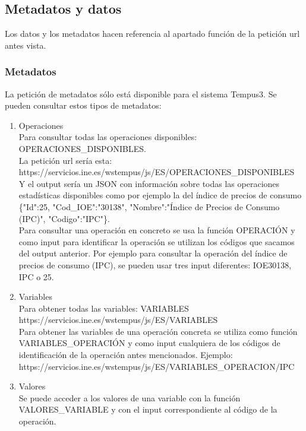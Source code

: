 \subsection{Metadatos y datos}
Los datos y los metadatos hacen referencia al apartado {función} de la petición url antes vista.
\subsubsection{Metadatos}
La petición de metadatos sólo está disponible para el sistema Tempus3. Se pueden consultar estos tipos de metadatos:
\begin{enumerate}
    \item Operaciones\\ Para consultar todas las operaciones disponibles:\\ OPERACIONES\_DISPONIBLES.\\ La petición url sería esta:\\ https://servicios.ine.es/wstempus/js/ES/OPERACIONES\_DISPONIBLES\\ Y el output sería un JSON con información sobre todas las operaciones estadísticas disponibles como por ejemplo la del índice de precios de consumo\\
    \{"Id":25, "Cod\_IOE":"30138", "Nombre":"Índice de Precios de Consumo (IPC)", "Codigo":"IPC"\}.\\
    Para consultar una operación en concreto se usa la función OPERACIÓN y como input para identificar la operación se utilizan los códigos que sacamos del output anterior. Por ejemplo para consultar la operación del índice de precios de consumo (IPC), se pueden usar tres input diferentes:  IOE30138, IPC o 25.
    \item Variables\\
    Para obtener todas las variables: VARIABLES\\ https://servicios.ine.es/wstempus/js/ES/VARIABLES\\
    Para obtener las variables de una operación concreta se utiliza como función VARIABLES\_OPERACIÓN y como input cualquiera de los códigos de identificación de la operación antes mencionados. Ejemplo: https://servicios.ine.es/wstempus/js/ES/VARIABLES\_OPERACION/IPC \\
    \item Valores\\
    Se puede acceder a los valores de una variable con la función VALORES\_VARIABLE y con el input correspondiente al código de la operación.\\

\end{enumerate}
